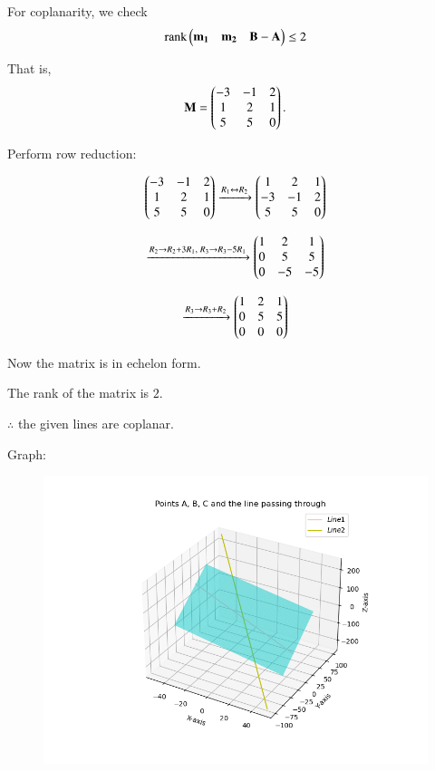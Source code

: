 \documentclass[journal,12pt,onecolumn]{IEEEtran}
\begin{document}
For coplanarity, we check
\begin{align}
\text{rank} \begin{pmatrix} \mathbf{m_1} & \mathbf{m_2} & \mathbf{B}-\mathbf{A} \end{pmatrix} \leq 2
\end{align}

That is,
\begin{align}
	\mathbf{M} = \begin{pmatrix} 
-3 & -1 & 2 \\
1 & 2 & 1 \\
5 & 5 & 0 
\end{pmatrix}.
\end{align}

Perform row reduction:

\begin{align}
\begin{pmatrix}
-3 & -1 & 2 \\
1 & 2 & 1 \\
5 & 5 & 0
\end{pmatrix}
\xrightarrow[]{R_1 \leftrightarrow R_2}
\begin{pmatrix}
1 & 2 & 1 \\
-3 & -1 & 2 \\
5 & 5 & 0
\end{pmatrix}
\end{align}

\begin{align}
\xrightarrow[]{R_2 \to R_2 + 3R_1,\; R_3 \to R_3 - 5R_1}
\begin{pmatrix}
1 & 2 & 1 \\
0 & 5 & 5 \\
0 & -5 & -5
\end{pmatrix}
\end{align}

\begin{align}
\xrightarrow[]{R_3 \to R_3 + R_2}
\begin{pmatrix}
1 & 2 & 1 \\
0 & 5 & 5 \\
0 & 0 & 0
\end{pmatrix}
\end{align}

Now the matrix is in echelon form.  

The rank of the matrix is \(2\).

$\therefore$ the given lines are coplanar.
		

Graph:
\begin{figure}[H]
    \centering
    \includegraphics[scale=0.5]{plot}
    \caption{}
    \label{fig:plot}
\end{figure}
\end{document}
